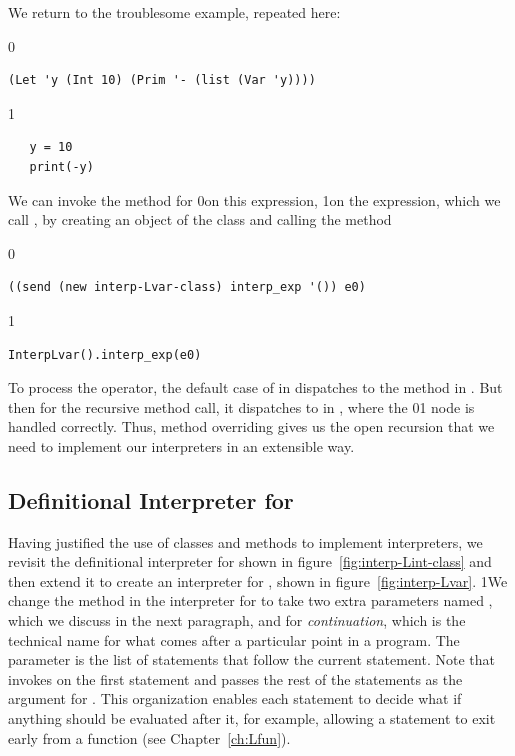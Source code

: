 \documentclass[7x10]{TimesAPriori_MIT}%
\def\racketEd{0}
\def\pythonEd{1}
\providecommand{\BookEdition}{1}
\let\edition\BookEdition
\newcommand{\racket}[1]{{\if\edition\racketEd{#1}\fi}}
\newcommand{\pythonColor}[0]{}
\newcommand{\python}[1]{{\if\edition\pythonEd\pythonColor #1\fi}}
\numberwithin{theorem}{chapter}
\numberwithin{definition}{chapter}
\numberwithin{equation}{chapter}
\begin{document}
We return to the troublesome example, repeated here:
{\if\edition\racketEd  
\begin{lstlisting}
(Let 'y (Int 10) (Prim '- (list (Var 'y))))
\end{lstlisting}
\fi}
{\if\edition\pythonEd\pythonColor
\begin{lstlisting}
   y = 10
   print(-y)
\end{lstlisting}
\fi}
\noindent We can invoke the  method for \LangVar{}
\racket{on this expression,}%
\python{on the  expression,}
%
which we call , by creating an object of the \LangVar{} class
and calling the  method
{\if\edition\racketEd
\begin{lstlisting}
((send (new interp-Lvar-class) interp_exp '()) e0)
\end{lstlisting}
\fi}
{\if\edition\pythonEd\pythonColor
\begin{lstlisting}
InterpLvar().interp_exp(e0)
\end{lstlisting}
\fi}
\noindent To process the \code{-} operator, the default case of
 in \LangVar{} dispatches to the 
method in \LangInt{}. But then for the recursive method call, it
dispatches to  in \LangVar{}, where the
\racket{}\python{} node is handled correctly.
Thus, method overriding gives us the open recursion that we need to
implement our interpreters in an extensible way.


\subsection{Definitional Interpreter for \LangVar{}}
\label{sec:interp-Lvar}

Having justified the use of classes and methods to implement
interpreters, we revisit the definitional interpreter for \LangInt{}
shown in figure~\ref{fig:interp-Lint-class} and then extend it to
create an interpreter for \LangVar{}, shown in
figure~\ref{fig:interp-Lvar}.
%
\python{We change the  method in the interpreter
  for \LangInt{} to take two extra parameters named \code{env}, which
  we discuss in the next paragraph, and \code{cont} for
  \emph{continuation}, which is the technical name for what comes
  after a particular point in a program. The \code{cont} parameter is
  the list of statements that follow the current statement.  Note
  that \code{interp\_stmts} invokes \code{interp\_stmt} on the first
  statement and passes the rest of the statements as the argument for
  \code{cont}. This organization enables each statement to decide what
  if anything should be evaluated after it, for example, allowing a
  \code{return} statement to exit early from a function (see
  Chapter~\ref{ch:Lfun}).}
\end{document}
